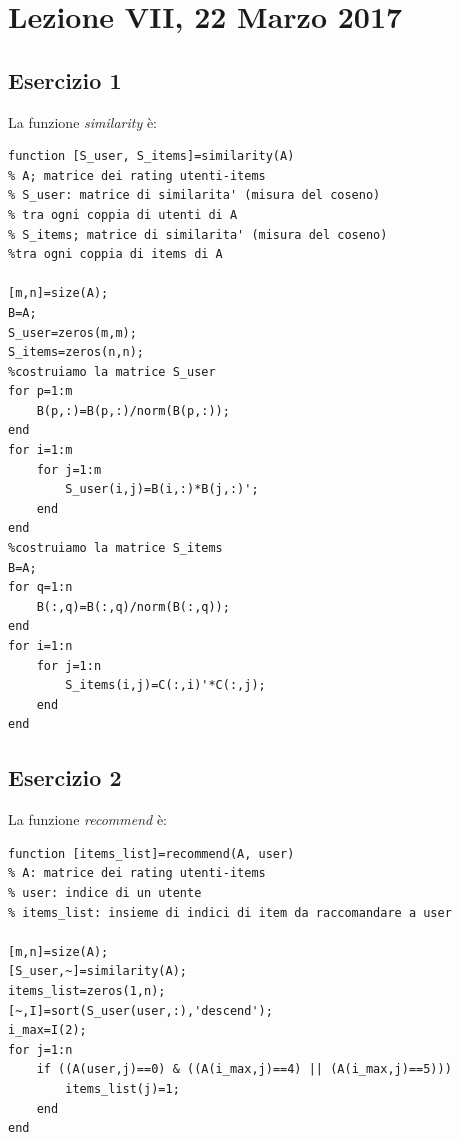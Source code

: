 \documentclass[11pt,a4paper,twoside,openright,titlepage,
                           headinclude,footinclude,BCOR5mm,
                           numbers=noenddot,cleardoublepage=empty,
                           tablecaptionabove]{scrbook}
\begin{document}

\chapter{Lezione VII, 22 Marzo 2017}
\section{Esercizio 1}
La funzione \emph{similarity} è:
\begin{lstlisting}[frame=trBL]
function [S_user, S_items]=similarity(A)
% A; matrice dei rating utenti-items
% S_user: matrice di similarita' (misura del coseno) 
% tra ogni coppia di utenti di A
% S_items; matrice di similarita' (misura del coseno) 
%tra ogni coppia di items di A

[m,n]=size(A);
B=A;
S_user=zeros(m,m);
S_items=zeros(n,n);
%costruiamo la matrice S_user
for p=1:m
    B(p,:)=B(p,:)/norm(B(p,:));
end
for i=1:m
    for j=1:m
        S_user(i,j)=B(i,:)*B(j,:)';
    end
end
%costruiamo la matrice S_items
B=A;
for q=1:n
    B(:,q)=B(:,q)/norm(B(:,q));
end
for i=1:n
    for j=1:n
        S_items(i,j)=C(:,i)'*C(:,j);
    end
end
\end{lstlisting}
\newpage
\section{Esercizio 2}
La funzione \emph{recommend} è:
\begin{lstlisting}[frame=trBL]
function [items_list]=recommend(A, user)
% A: matrice dei rating utenti-items
% user: indice di un utente
% items_list: insieme di indici di item da raccomandare a user

[m,n]=size(A);
[S_user,~]=similarity(A);
items_list=zeros(1,n);
[~,I]=sort(S_user(user,:),'descend');
i_max=I(2);
for j=1:n
    if ((A(user,j)==0) & ((A(i_max,j)==4) || (A(i_max,j)==5)))
        items_list(j)=1;
    end
end
\end{lstlisting}
\end{document}
